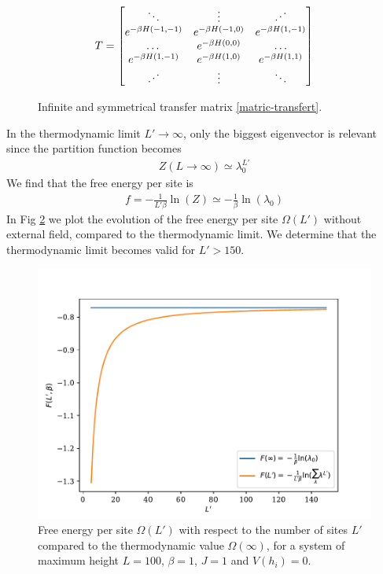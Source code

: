 \begin{figure}
\begin{align}
T = \begin{bmatrix} 
\ddots & \vdots & \reflectbox{$\ddots$} \\ 
e^{-\beta H(-1,-1)} & e^{-\beta H(-1,0)} & e^{-\beta H(1,-1)} \\
\dots & e^{-\beta H(0,0)} & \dots \\
e^{-\beta H(1,-1)} & e^{-\beta H(1,0)} & e^{-\beta H(1,1)} \\ 
\reflectbox{$\ddots$} & \vdots &\ddots \\ 
\end{bmatrix}
\end{align}
\caption{Infinite and symmetrical transfer matrix \ref{matric-transfert}.}
\label{mat-inf}
\end{figure}

In the thermodynamic limit $L' \to \infty$, only the biggest eigenvector is relevant since the partition function becomes
\begin{align}
Z(L\to \infty) \simeq \lambda_0^{L'}
\end{align}
We find that the free energy per site is 
\begin{align}
f = - \frac{1}{L' \beta} \ln(Z) \simeq - \frac{1}{\beta } \ln( \lambda_0)
\label{energie-libre-site}
\end{align}
In Fig \ref{fig-thermo-libre} we plot the evolution of the free energy per site $\Omega(L')$ without external field, compared to the thermodynamic limit. We determine that the thermodynamic limit becomes valid for $L' \greater 150 $.

\begin{figure}
\centering
\includegraphics[width=0.7\linewidth]{int-dyn/freeene-thermo-libre.pdf}
\caption{Free energy per site $\Omega(L')$ with respect to the number of sites $L'$ compared to the thermodynamic value $\Omega(\infty)$, for a system of maximum height $L=100$, $\beta=1$, $J=1$ and $V(h_i)=0$.}
\label{fig-thermo-libre}
\vspace{-0.5cm}
\end{figure} 

